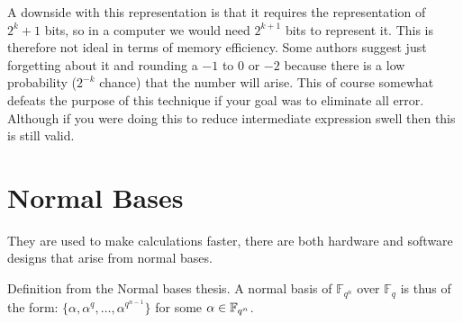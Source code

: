 A downside with this representation is that it requires the representation of $2^k + 1$ bits, so in a computer we would need $2^{k+1}$ bits to represent it. This is therefore not ideal in terms of memory efficiency. Some authors suggest just forgetting about it and rounding a $-1$ to $0$ or $-2$ because there is a low probability ($2^{-k}$ chance) that the number will arise. This of course somewhat defeats the purpose of this technique if your goal was to eliminate all error. Although if you were doing this to reduce intermediate expression swell then this is still valid.\\


\section{Normal Bases}
They are used to make calculations faster, there are both hardware and software designs that arise from normal bases.

Definition from the Normal bases thesis.
A normal basis of $\mathbb{F}_{q^n}$ over $\mathbb{F}_q$ is thus of the form: $\{\alpha,\alpha^q,\ldots ,\alpha^{q^{n-1}}\}$ for some $\alpha \in \mathbb{F}_{q^n}$.


